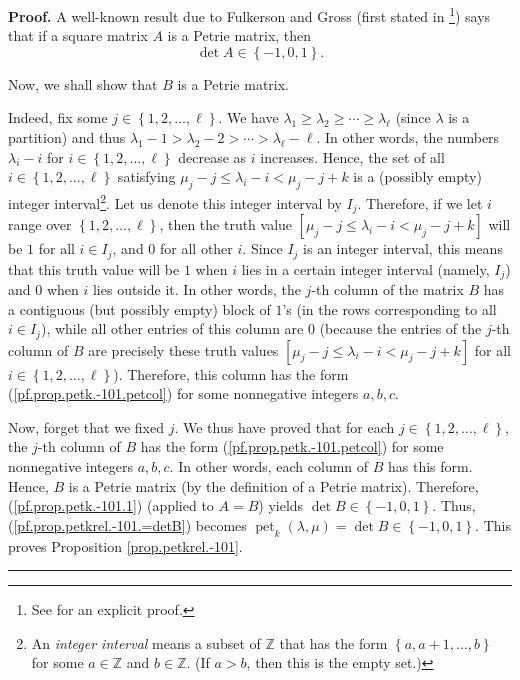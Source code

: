 \documentclass[numbers=enddot,12pt,final,onecolumn,notitlepage]{scrartcl}%
\theoremstyle{definition}
\newenvironment{proof}[1][Proof]{\noindent\textbf{#1.} }{\ \rule{0.5em}{0.5em}}
\begin{document}
\begin{proof}
A well-known result due to Fulkerson and Gross (first stated in \cite[\S 8]%
{FulGro65}\footnote{See \cite[Theorem 1]{GorWil74} for an explicit proof.})
says that if a square matrix $A$ is a Petrie matrix, then%
\begin{equation}
\det A\in\left\{  -1,0,1\right\}  . \label{pf.prop.petk.-101.1}%
\end{equation}


Now, we shall show that $B$ is a Petrie matrix.

Indeed, fix some $j\in\left\{  1,2,\ldots,\ell\right\}  $. We have
$\lambda_{1}\geq\lambda_{2}\geq\cdots\geq\lambda_{\ell}$ (since $\lambda$ is a
partition) and thus $\lambda_{1}-1>\lambda_{2}-2>\cdots>\lambda_{\ell}-\ell$.
In other words, the numbers $\lambda_{i}-i$ for $i\in\left\{  1,2,\ldots
,\ell\right\}  $ decrease as $i$ increases. Hence, the set of all
$i\in\left\{  1,2,\ldots,\ell\right\}  $ satisfying $\mu_{j}-j\leq\lambda
_{i}-i<\mu_{j}-j+k$ is a (possibly empty) integer interval\footnote{An
\emph{integer interval} means a subset of $\mathbb{Z}$ that has the form
$\left\{  a,a+1,\ldots,b\right\}  $ for some $a\in\mathbb{Z}$ and
$b\in\mathbb{Z}$. (If $a>b$, then this is the empty set.)}. Let us denote this
integer interval by $I_{j}$. Therefore, if we let $i$ range over $\left\{
1,2,\ldots,\ell\right\}  $, then the truth value $\left[  \mu_{j}-j\leq
\lambda_{i}-i<\mu_{j}-j+k\right]  $ will be $1$ for all $i\in I_{j}$, and $0$
for all other $i$. Since $I_{j}$ is an integer interval, this means that this
truth value will be $1$ when $i$ lies in a certain integer interval (namely,
$I_{j}$) and $0$ when $i$ lies outside it. In other words, the $j$-th column
of the matrix $B$ has a contiguous (but possibly empty) block of $1$'s (in the
rows corresponding to all $i\in I_{j}$), while all other entries of this
column are $0$ (because the entries of the $j$-th column of $B$ are precisely
these truth values $\left[  \mu_{j}-j\leq\lambda_{i}-i<\mu_{j}-j+k\right]  $
for all $i\in\left\{  1,2,\ldots,\ell\right\}  $). Therefore, this column has
the form (\ref{pf.prop.petk.-101.petcol}) for some nonnegative integers
$a,b,c$.

Now, forget that we fixed $j$. We thus have proved that for each $j\in\left\{
1,2,\ldots,\ell\right\}  $, the $j$-th column of $B$ has the form
(\ref{pf.prop.petk.-101.petcol}) for some nonnegative integers $a,b,c$. In
other words, each column of $B$ has this form. Hence, $B$ is a Petrie matrix
(by the definition of a Petrie matrix). Therefore, (\ref{pf.prop.petk.-101.1})
(applied to $A=B$) yields $\det B\in\left\{  -1,0,1\right\}  $. Thus,
(\ref{pf.prop.petkrel.-101.=detB}) becomes $\operatorname*{pet}\nolimits_{k}%
\left(  \lambda,\mu\right)  =\det B\in\left\{  -1,0,1\right\}  $. This proves
Proposition \ref{prop.petkrel.-101}.
\end{proof}
\end{document}
